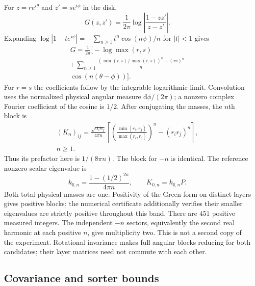\documentclass[aps,pra,reprint,superscriptaddress,longbibliography]{revtex4-2}
\newcommand{\dd}{\mathrm d}
\begin{document}
For $z=re^{i\theta}$ and $z'=se^{i\phi}$ in the disk,
\[
 G(z,z')=\frac1{2\pi}\log
           \left|\frac{1-z\overline{z'}}{z-z'}\right|.
\]
Expanding $\log|1-te^{i\psi}|=-\sum_{n\ge1}t^n\cos(n\psi)/n$
for $|t|<1$ gives
\[
\begin{gathered}
 G=\frac1{2\pi}\bigl[-\log\max(r,s)
\\
 +\sum_{n\ge1}\frac{(\min(r,s)/\max(r,s))^n-(rs)^n}{n}
\\
                      \cos(n(\theta-\phi))\bigr].
\end{gathered}
\]
For $r=s$ the coefficients follow by the integrable logarithmic
limit. Convolution uses the normalized physical angular measure
$\dd\phi/(2\pi)$; a nonzero complex Fourier coefficient of the
cosine is $1/2$. After conjugating the masses, the $n$th block is
\begin{equation}
\begin{gathered}
 (K_n)_{ij}=\frac{\sqrt{\alpha_i\alpha_j}}{4\pi n}
 \left[\left(\frac{\min(r_i,r_j)}{\max(r_i,r_j)}\right)^n
                         -(r_ir_j)^n\right],\\
 n\ge1.
 \label{sgt:finite:green-block}
\end{gathered}
\end{equation}
Thus its prefactor here is $1/(8\pi n)$. The block for $-n$ is
identical. The reference nonzero scalar eigenvalue is
\begin{equation}
 k_{0,n}=\frac{1-(1/2)^{2n}}{4\pi n},\qquad
 K_{0,n}=k_{0,n}P.
 \label{sgt:finite:reference-block}
\end{equation}
Both total physical masses are one. Positivity of the Green form on
distinct layers gives positive blocks; the numerical certificate
additionally verifies their smaller eigenvalues are strictly positive
throughout this band. There are $451$ positive measured integers.
The independent $-n$ sectors, equivalently the second real harmonic
at each positive $n$, give multiplicity two. This is not a second
copy of the experiment. Rotational invariance makes full angular
blocks reducing for both candidates; their layer matrices need not
commute with each other.

\subsection{Covariance and sorter bounds}
\label{sgt:finite:sorter}
\end{document}
